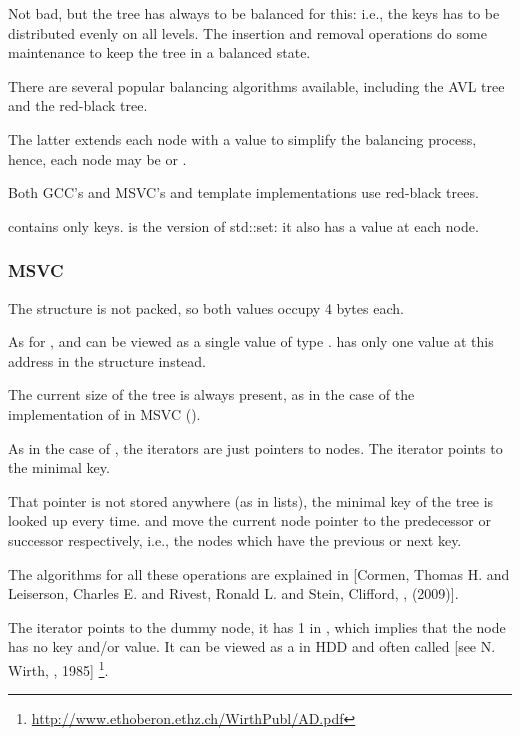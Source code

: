 Not bad, but the tree has always to be balanced for this: i.e., the keys has to be distributed evenly on all levels.
The insertion and removal operations do some maintenance to keep the tree in a balanced state.

There are several popular balancing algorithms available, including the AVL tree and the red-black tree.

The latter extends each node with a  value to simplify the balancing process, hence, 
each node may be  or .

Both GCC's and MSVC's  and  template implementations use red-black trees.

 contains only keys.
 is the  version of std::set: it also has a value at each node.

\subsubsection{MSVC}





The structure is not packed, so both \Tchar values occupy 4 bytes each.

As for ,  and  can be viewed as a single value of type .
has only one value at this address in the structure instead.

The current size of the tree is always present, as in the case of the implementation of  in MSVC ().

As in the case of , 
the iterators are just pointers to nodes.
The  iterator points to the minimal key.

That pointer is not stored anywhere (as in lists), the minimal key of the tree is looked up every time.
 and  
move the current node pointer to the predecessor or successor respectively, i.e., the nodes which have the previous or next key.

The algorithms for all these operations are explained in
[Cormen, Thomas H. and Leiserson, Charles E. and Rivest, Ronald L. and Stein, Clifford,
, (2009)].

The  iterator points to the dummy node, it has 1 in , which implies that 
the node has no key and/or value.
It can be viewed as a  in \ac{HDD}
and often called  [see N. Wirth, , 1985]
\footnote{\url{http://www.ethoberon.ethz.ch/WirthPubl/AD.pdf}}.

